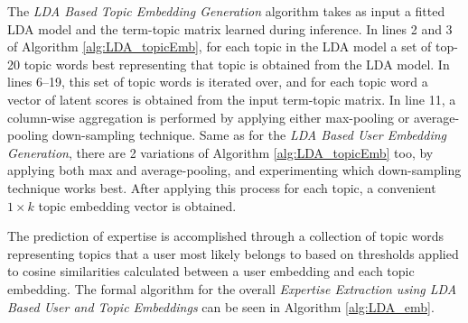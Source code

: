             The \emph{LDA Based Topic Embedding Generation} algorithm takes as input a fitted LDA model and the term-topic matrix learned during inference. In lines 2 and 3 of Algorithm \ref{alg:LDA_topicEmb}, for each topic in the LDA model a set of top-20 topic words best representing that topic is obtained from the LDA model. In lines 6--19, this set of topic words is iterated over, and for each topic word a vector of latent scores is obtained from the input term-topic matrix. In line 11, a column-wise aggregation is performed by applying either max-pooling or average-pooling down-sampling technique. Same as for the \emph{LDA Based User Embedding Generation}, there are 2 variations of Algorithm \ref{alg:LDA_topicEmb} too, by applying both max and average-pooling, and experimenting which down-sampling technique works best. After applying this process for each topic, a convenient $1 \times k$ topic embedding vector is obtained.
            
            The prediction of expertise is accomplished through a collection of topic words representing topics that a user most likely belongs to based on thresholds applied to cosine similarities calculated between a user embedding and each topic embedding. The formal algorithm for the overall \emph{Expertise Extraction using LDA Based User and Topic Embeddings} can be seen in Algorithm \ref{alg:LDA_emb}.
        

